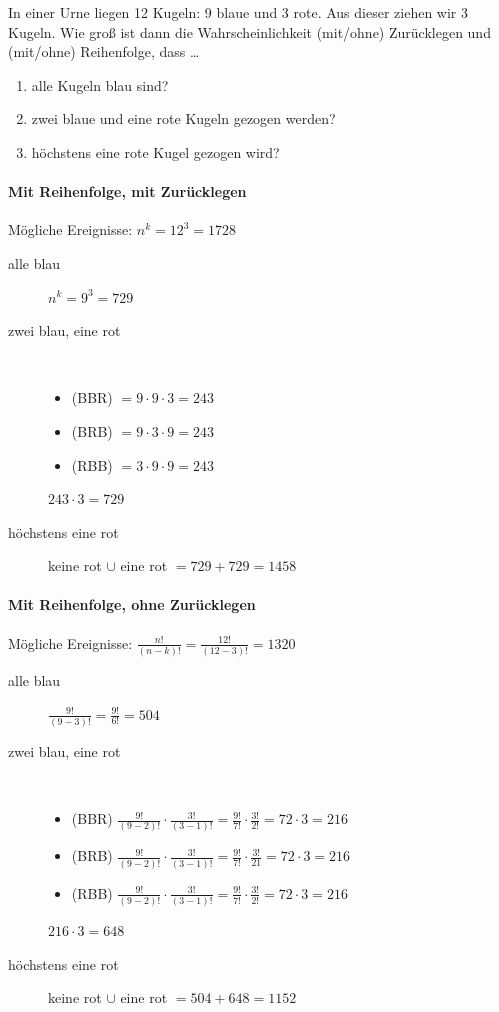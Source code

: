 \documentclass[11pt, a4paper]{article}
\newif\ifshowsolution
\begin{document}
In einer Urne liegen 12 Kugeln: 9 blaue und 3 rote. Aus dieser ziehen wir 3 Kugeln. Wie groß ist dann die Wahrscheinlichkeit (mit/ohne) Zurücklegen und (mit/ohne) Reihenfolge, dass \dots
\begin{enumerate}
	\item alle Kugeln blau sind?
	\item zwei blaue und eine rote Kugeln gezogen werden?
	\item höchstens eine rote Kugel gezogen wird?
\end{enumerate}

\ifshowsolution
	\paragraph{Mit Reihenfolge, mit Zurücklegen}
	Mögliche Ereignisse: $n^k = 12^3 = 1728$
	\begin{description}
		\item[alle blau] $n^k = 9^3 = 729$
		\item[zwei blau, eine rot] \ 
			\begin{itemize}
				\item (BBR) $= 9 \cdot 9 \cdot 3 = 243$
				\item (BRB) $= 9 \cdot 3 \cdot 9 = 243$
				\item (RBB) $= 3 \cdot 9 \cdot 9 = 243$
			\end{itemize}
			$243 \cdot 3 = 729$
		\item[höchstens eine rot] keine rot $\cup$ eine rot $= 729+729 = 1458$
	\end{description}

	\paragraph{Mit Reihenfolge, ohne Zurücklegen}
	Mögliche Ereignisse: $\frac{n!}{(n-k)!} = \frac{12!}{(12-3)!} = 1320$
	\begin{description}
		\item[alle blau] $\frac{9!}{(9-3)!} = \frac{9!}{6!} = 504$
		\item[zwei blau, eine rot] \
			\begin{itemize}
				\item (BBR) $\frac{9!}{(9-2)!} \cdot \frac{3!}{(3-1)!} = \frac{9!}{7!} \cdot \frac{3!}{2!} = 72 \cdot 3 = 216$
				\item (BRB) $\frac{9!}{(9-2)!} \cdot \frac{3!}{(3-1)!} = \frac{9!}{7!} \cdot \frac{3!}{21} = 72 \cdot 3 = 216$
				\item (RBB) $\frac{9!}{(9-2)!} \cdot \frac{3!}{(3-1)!} = \frac{9!}{7!} \cdot \frac{3!}{2!} = 72 \cdot 3 = 216$
			\end{itemize}
			$216 \cdot 3 = 648$
		\item[höchstens eine rot] keine rot $\cup$ eine rot $= 504 + 648 = 1152$
	\end{description}
\end{document}
